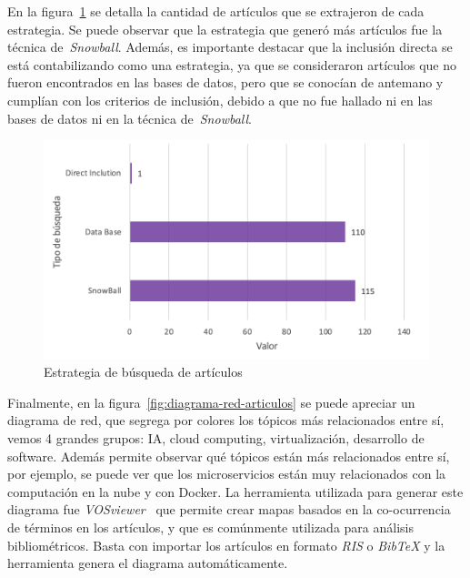 \noindent
En la figura~\ref{fig:estrategia-busqueda-articulos} se detalla la cantidad de artículos que se extrajeron de cada estrategia. Se puede observar que la estrategia que generó más artículos fue la técnica de~\textit{Snowball}. Además, es importante destacar que la inclusión directa se está contabilizando como una estrategia, ya que se consideraron artículos que no fueron encontrados en las bases de datos, pero que se conocían de antemano y cumplían con los criterios de inclusión, debido a que no fue hallado ni en las bases de datos ni en la técnica de~\textit{Snowball}.
\begin{figure}[H]
    \centering
    \includegraphics[scale=0.8]{tablas-images/cp2/estrategia-busqueda-articulos.png}
    \caption{Estrategia de búsqueda de artículos}\label{fig:estrategia-busqueda-articulos}
\end{figure}
\noindent
Finalmente, en la figura~\ref{fig:diagrama-red-articulos} se puede apreciar un diagrama de red, que segrega por colores los tópicos más relacionados entre sí, vemos 4 grandes grupos: IA, cloud computing, virtualización, desarrollo de software. Además permite observar qué tópicos están más relacionados entre sí, por ejemplo, se puede ver que los microservicios están muy relacionados con la computación en la nube y con Docker. La herramienta utilizada para generar este diagrama fue \textit{VOSviewer}~\citep{vosviewer_website} que permite crear mapas basados en la co-ocurrencia de términos en los artículos, y que es comúnmente utilizada para análisis bibliométricos. Basta con importar los artículos en formato \textit{RIS} o \textit{BibTeX} y la herramienta genera el diagrama automáticamente.

